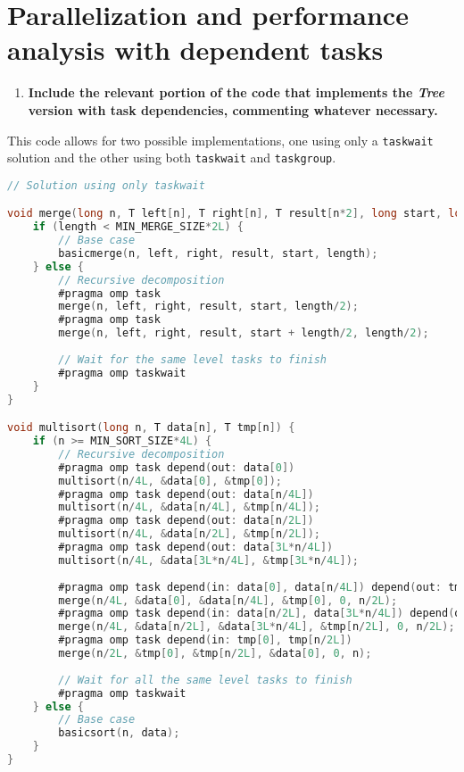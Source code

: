 \documentclass[a4paper]{article}
\newenvironment{questionenum}{%
\setlist[enumerate]{resume}
\restartlist{enumerate}
\newcommand{\question}[1]{
\begin{enumerate}
	\item\bfseries ##1
\end{enumerate}
}}{%
}
\begin{document}
\section{Parallelization and performance analysis with dependent tasks}
\begin{questionenum}
	\question{Include the relevant portion of the code that implements the \textit{Tree} version with task dependencies, commenting whatever necessary.}
    
    This code allows for two possible implementations, one using only a \texttt{taskwait} solution and the other using both \texttt{taskwait} and \texttt{taskgroup}.
    
    \begin{lstlisting}[language=C, title=\texttt{multisort-omp-tree-dep-taskwait.c}]
// Solution using only taskwait

void merge(long n, T left[n], T right[n], T result[n*2], long start, long length) {
    if (length < MIN_MERGE_SIZE*2L) {
        // Base case
        basicmerge(n, left, right, result, start, length);
    } else {
        // Recursive decomposition
        #pragma omp task
        merge(n, left, right, result, start, length/2);
        #pragma omp task
        merge(n, left, right, result, start + length/2, length/2);
        
        // Wait for the same level tasks to finish
        #pragma omp taskwait
    }
}

void multisort(long n, T data[n], T tmp[n]) {
    if (n >= MIN_SORT_SIZE*4L) {
        // Recursive decomposition
        #pragma omp task depend(out: data[0])
        multisort(n/4L, &data[0], &tmp[0]);
        #pragma omp task depend(out: data[n/4L])
        multisort(n/4L, &data[n/4L], &tmp[n/4L]);
        #pragma omp task depend(out: data[n/2L])
        multisort(n/4L, &data[n/2L], &tmp[n/2L]);
        #pragma omp task depend(out: data[3L*n/4L])
        multisort(n/4L, &data[3L*n/4L], &tmp[3L*n/4L]);
        
        #pragma omp task depend(in: data[0], data[n/4L]) depend(out: tmp[0])
        merge(n/4L, &data[0], &data[n/4L], &tmp[0], 0, n/2L);
        #pragma omp task depend(in: data[n/2L], data[3L*n/4L]) depend(out: tmp[n/2L])
        merge(n/4L, &data[n/2L], &data[3L*n/4L], &tmp[n/2L], 0, n/2L);
        #pragma omp task depend(in: tmp[0], tmp[n/2L])
        merge(n/2L, &tmp[0], &tmp[n/2L], &data[0], 0, n);
        
        // Wait for all the same level tasks to finish
        #pragma omp taskwait
    } else {
        // Base case
        basicsort(n, data);
    }
}


\end{lstlisting}
\end{questionenum}
\end{document}

